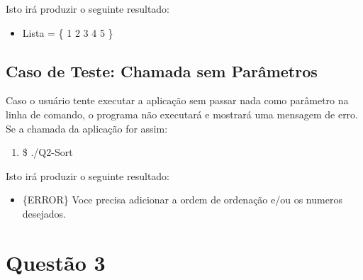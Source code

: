   Isto irá produzir o seguinte resultado:

  \begin{itemize}
    \item Lista = \{ 1 2 3 4 5 \}
  \end{itemize}

    \subsection{Caso de Teste: Chamada sem Parâmetros}

  Caso o usuário tente executar a aplicação sem passar nada como parâmetro na linha de comando, o programa não executará
  e mostrará uma mensagem de erro. Se a chamada da aplicação for assim:

  \begin{enumerate}
    \item \$ ./Q2-Sort
  \end{enumerate}


  Isto irá produzir o seguinte resultado:

  \begin{itemize}
    \item \{ERROR\} Voce precisa adicionar a ordem de ordenação e/ou os numeros desejados.
  \end{itemize}

\section{Questão 3}


